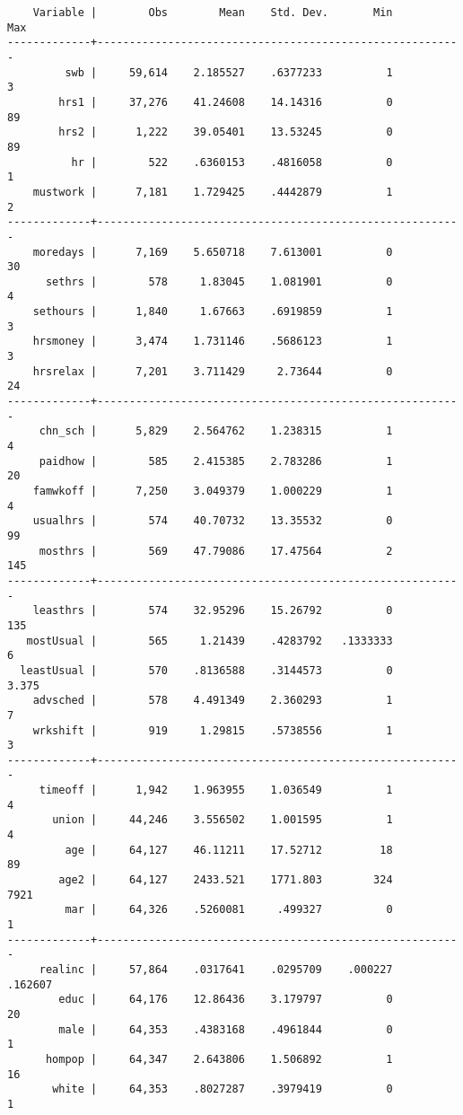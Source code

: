 \documentclass[10pt, letterpaper]{article}
\begin{document}
\begin{spacing}{1.4}
{\begin{spacing}{.9}
\begin{verbatim}
    Variable |        Obs        Mean    Std. Dev.       Min        Max
-------------+---------------------------------------------------------
         swb |     59,614    2.185527    .6377233          1          3
        hrs1 |     37,276    41.24608    14.14316          0         89
        hrs2 |      1,222    39.05401    13.53245          0         89
          hr |        522    .6360153    .4816058          0          1
    mustwork |      7,181    1.729425    .4442879          1          2
-------------+---------------------------------------------------------
    moredays |      7,169    5.650718    7.613001          0         30
      sethrs |        578     1.83045    1.081901          0          4
    sethours |      1,840     1.67663    .6919859          1          3
    hrsmoney |      3,474    1.731146    .5686123          1          3
    hrsrelax |      7,201    3.711429     2.73644          0         24
-------------+---------------------------------------------------------
     chn_sch |      5,829    2.564762    1.238315          1          4
     paidhow |        585    2.415385    2.783286          1         20
    famwkoff |      7,250    3.049379    1.000229          1          4
    usualhrs |        574    40.70732    13.35532          0         99
     mosthrs |        569    47.79086    17.47564          2        145
-------------+---------------------------------------------------------
    leasthrs |        574    32.95296    15.26792          0        135
   mostUsual |        565     1.21439    .4283792   .1333333          6
  leastUsual |        570    .8136588    .3144573          0      3.375
    advsched |        578    4.491349    2.360293          1          7
    wrkshift |        919     1.29815    .5738556          1          3
-------------+---------------------------------------------------------
     timeoff |      1,942    1.963955    1.036549          1          4
       union |     44,246    3.556502    1.001595          1          4
         age |     64,127    46.11211    17.52712         18         89
        age2 |     64,127    2433.521    1771.803        324       7921
         mar |     64,326    .5260081     .499327          0          1
-------------+---------------------------------------------------------
     realinc |     57,864    .0317641    .0295709    .000227    .162607
        educ |     64,176    12.86436    3.179797          0         20
        male |     64,353    .4383168    .4961844          0          1
      hompop |     64,347    2.643806    1.506892          1         16
       white |     64,353    .8027287    .3979419          0          1

\end{verbatim}
\end{spacing}}
\end{spacing}
\end{document}
